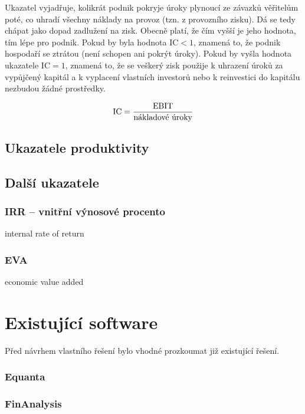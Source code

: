 Ukazatel vyjadřuje, kolikrát podnik pokryje úroky plynoucí ze závazků věřitelům poté, co uhradí všechny náklady na provoz (tzn. z provozního zisku). Dá se tedy chápat jako dopad zadlužení na zisk. Obecně platí, že čím vyšší je jeho hodnota, tím lépe pro podnik. Pokud by byla hodnota IC$<1$, znamená to, že podnik hospodaří se ztrátou (není schopen ani pokrýt úroky). Pokud by vyšla hodnota ukazatele IC$=1$, znamená to, že se veškerý zisk použije k uhrazení úroků za vypůjčený kapitál a k vyplacení vlastních investorů nebo k reinvestici do kapitálu nezbudou žádné prostředky.

$$\text{IC} = \dfrac{\text{EBIT}}{\text{nákladové úroky}}$$



\subsection{Ukazatele produktivity}

\subsection{Další ukazatele}

\subsubsection{IRR -- vnitřní výnosové procento}
internal rate of return

\subsubsection{EVA}
economic value added

\section{Existující software}
Před návrhem vlastního řešení bylo vhodné prozkoumat již existující řešení. 

\subsubsection{Equanta\sffamily\textregistered}
\subsubsection{FinAnalysis}
